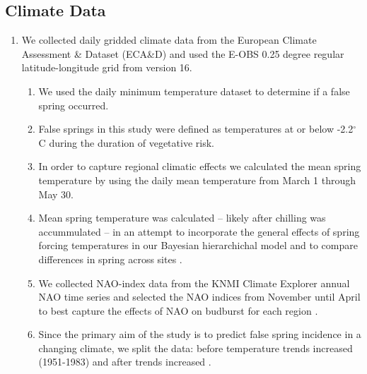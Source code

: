 \documentclass{article}\usepackage[]{graphicx}\usepackage[]{color}
\begin{document}
\subsection*{Climate Data}
\begin{enumerate}
\item We collected daily gridded climate data from the European Climate Assessment \& Dataset (ECA\&D) and used the E-OBS 0.25 degree regular latitude-longitude grid from version 16. 
  \begin{enumerate}
\item We used the daily minimum temperature dataset to determine if a false spring occurred.
\item False springs in this study were defined as temperatures at or below -2.2$^{\circ}$C \citep{Schwartz1993} during the duration of vegetative risk.
\item In order to capture regional climatic effects we calculated the mean spring temperature by using the daily mean temperature from March 1 through May 30.
\item Mean spring temperature was calculated -- likely after chilling was accummulated -- in an attempt to incorporate the general effects of spring forcing temperatures in our Bayesian hierarchichal model and to compare differences in spring across sites \citep{Basler2012, Korner2016}.
\item We collected NAO-index data from the KNMI Climate Explorer annual NAO time series and selected the NAO indices from November until April to best capture the effects of NAO on budburst for each region \citep{NAO}.
\item Since the primary aim of the study is to predict false spring incidence in a changing climate, we split the data: before temperature trends increased (1951-1983) and after trends increased \citep[1984-2016,][]{Stocker2013, Kharouba2018}.
  \end{enumerate}
\end{enumerate}
\end{document}
